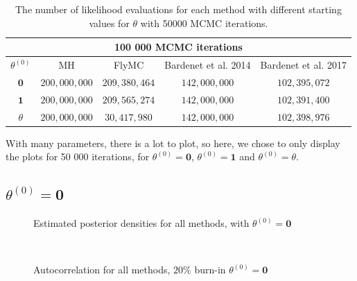  \begin{table}[ht]
    \centering
\begin{tabular}{|c|c|c|c|c|}
  \hline
    \multicolumn{5}{|c|}{100 000 MCMC iterations} \\
    \hline
\hline
        $\theta^{\left(0\right)}$ &  MH & FlyMC & Bardenet et al. 2014 & Bardenet et al. 2017\\ 
         \hline \hline$\mathbf{0}$ & $200,000,000$ & $209,380,464$ & $142,000,000$ & $102,395,072$ \\
        $\mathbf{1}$ & $200,000,000$ & $209,565,274$ & $142,000,000$ & $102,391,400$ \\
        $\theta$ & $200,000,000$ & $30,417,980$ & $142,000,000$ & $102,398,976$
        \\ \hline
\end{tabular}
\caption{The number of likelihood evaluations for each method with different starting values for $\theta$ with 50000 MCMC iterations.}
\label{tab:multiple_evals_100k}
\end{table} 
With many parameters, there is a lot to plot, so here, we chose to only display the plots for 50 000 iterations, for  $\theta^{\left(0\right)} = \mathbf{0}$, $\theta^{\left(0\right)} = \mathbf{1}$ and $\theta^{\left(0\right)} = \theta$.   

\subsection{$\theta^{\left(0\right)} = \mathbf{0}$}
\begin{figure}[ht]%
    \centering
    \qquad
    \caption{Estimated posterior densities for all methods, with $\theta^{\left(0\right)} = \mathbf{0}$}%
    \label{fig:density_50k_02_06_theta1}%
\end{figure}


\
\begin{figure}[ht]%
    \centering
    \qquad
    \caption{Autocorrelation for all methods, $20\%$ burn-in $\theta^{\left(0\right)} = \mathbf{0}$}%
    \label{fig:autocorrelation_50k_02_06_theta1}%
\end{figure}

